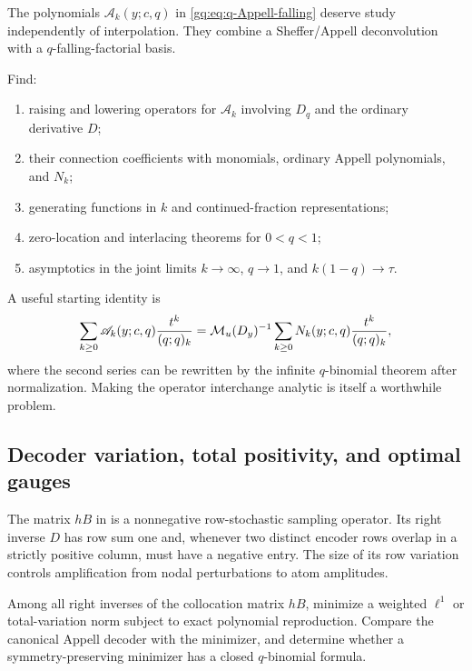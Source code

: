 The polynomials $\mathscr A_k(y;c,q)$ in
\eqref{gq:eq:q-Appell-falling} deserve study independently of interpolation.
They combine a Sheffer/Appell deconvolution with a $q$-falling-factorial
basis.

\begin{problem}
\label{gq:prob:q-Appell-structure}
Find:
\begin{enumerate}
\item raising and lowering operators for $\mathscr A_k$ involving $D_q$ and
      the ordinary derivative $D$;
\item their connection coefficients with monomials, ordinary Appell
      polynomials, and $N_k$;
\item generating functions in $k$ and continued-fraction representations;
\item zero-location and interlacing theorems for $0<q<1$;
\item asymptotics in the joint limits $k\to\infty$, $q\to1$, and
      $k(1-q)\to\tau$.
\end{enumerate}
\end{problem}

A useful starting identity is
\begin{equation}
 \sum_{k\ge0}\mathscr A_k(y;c,q)\frac{t^k}{(q;q)_k}
 =\mathcal M_u(D_y)^{-1}
  \sum_{k\ge0}N_k(y;c,q)\frac{t^k}{(q;q)_k},
 \label{gq:eq:q-Appell-formal-generating}
\end{equation}
where the second series can be rewritten by the infinite $q$-binomial
theorem after normalization.  Making the operator interchange analytic is
itself a worthwhile problem.

\subsection{Decoder variation, total positivity, and optimal gauges}

The matrix $hB$ in  is a
nonnegative row-stochastic sampling operator.  Its right inverse $D$ has row
sum one and, whenever two distinct encoder rows overlap in a strictly positive
column, must have a negative entry.  The size of its row variation controls
amplification from nodal perturbations to atom amplitudes.

\begin{problem}
\label{gq:prob:minimum-variation-decoder}
Among all right inverses of the collocation matrix $hB$, minimize a weighted
$\ell^1$ or total-variation norm subject to exact polynomial reproduction.
Compare the canonical Appell decoder with the minimizer, and determine
whether a symmetry-preserving minimizer has a closed $q$-binomial formula.
\end{problem}


